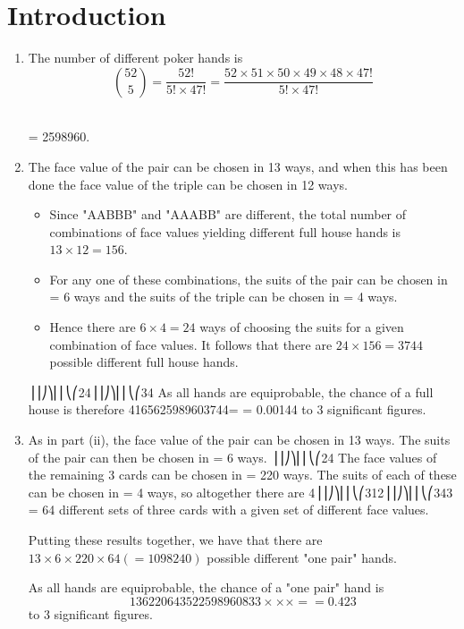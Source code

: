 \documentclass[a4paper,12pt]{article}
\begin{document}

\section{Introduction}

\begin{enumerate}
    \item The number of different poker hands is
    \[ {52 \choose 5}  = \frac{52!}{5! \times 47!}  = \frac{52 \times 51 \times 50 \times 49 \times 48 \times 47!}{5! \times 47!} \]\
   
= 2598960.
\item The face value of the pair can be chosen in 13 ways, and when this has been done the face value of the triple can be chosen in 12 ways. 
\begin{itemize}
\item Since "AABBB" and "AAABB" are different, the total number of combinations of face values yielding different full house hands is $13\times 12 = 156$.

\item For any one of these combinations, the suits of the pair can be chosen in = 6 ways and the suits of the triple can be chosen in = 4 ways. 

\item Hence there are $6\times 4 = 24$ ways of choosing the suits for a given combination of face values. It follows that there are $24 \times 156 = 3744$ possible different full house hands.
\end{itemize}

⎟⎟⎠⎞⎜⎜⎝⎛24⎟⎟⎠⎞⎜⎜⎝⎛34
As all hands are equiprobable, the chance of a full house is therefore 4165625989603744= = 0.00144 to 3 significant figures.
\item  As in part (ii), the face value of the pair can be chosen in 13 ways. The suits of the pair can then be chosen in = 6 ways. ⎟⎟⎠⎞⎜⎜⎝⎛24
The face values of the remaining 3 cards can be chosen in = 220 ways. The suits of each of these can be chosen in = 4 ways, so altogether there are 4⎟⎟⎠⎞⎜⎜⎝⎛312⎟⎟⎠⎞⎜⎜⎝⎛343 = 64 different sets of three cards with a given set of different face values.

Putting these results together, we have that there are $13×6×220×64 (= 1098240)$ possible different "one pair" hands. 

As all hands are equiprobable, the chance of a "one pair" hand is
\[136220643522598960833×××= = 0.423\] to 3 significant figures.\end{enumerate}
\end{document}

